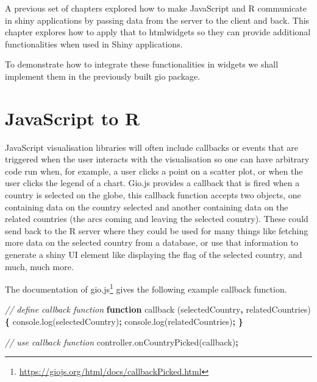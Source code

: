 \documentclass[
]{krantz}
\makeatletter
\newenvironment{Shaded}{\begin{snugshade}}{\end{snugshade}}
\newcommand{\AttributeTok}[1]{\textcolor[rgb]{0.61,0.61,0.61}{#1}}
\newcommand{\CommentTok}[1]{\textcolor[rgb]{0.37,0.37,0.37}{\textit{#1}}}
\newcommand{\KeywordTok}[1]{\textcolor[rgb]{0.27,0.27,0.27}{\textbf{#1}}}
\newcommand{\NormalTok}[1]{#1}
\newcommand{\OperatorTok}[1]{\textcolor[rgb]{0.43,0.43,0.43}{\textbf{#1}}}
\newcommand{\VariableTok}[1]{\textcolor[rgb]{0,0,0}{#1}}
\renewcommand{\href}[2]{#2\footnote{\url{#1}}}
\newenvironment{kframe}{%
\medskip{}
\setlength{\fboxsep}{.8em}
 \def\at@end@of@kframe{}%
 \ifinner\ifhmode%
  \def\at@end@of@kframe{\end{minipage}}%
  \begin{minipage}{\columnwidth}%
 \fi\fi%
 \def\FrameCommand##1{\hskip\@totalleftmargin \hskip-\fboxsep
 \colorbox{shadecolor}{##1}\hskip-\fboxsep
     \hskip-\linewidth \hskip-\@totalleftmargin \hskip\columnwidth}%
 \MakeFramed {\advance\hsize-\width
   \@totalleftmargin\z@ \linewidth\hsize
   \@setminipage}}%
 {\par\unskip\endMakeFramed%
 \at@end@of@kframe}
\renewenvironment{Shaded}{\begin{kframe}}{\end{kframe}}
\makeatother
\begin{document}
A previous set of chapters explored how to make JavaScript and R communicate in shiny applications by passing data from the server to the client and back. This chapter explores how to apply that to htmlwidgets so they can provide additional functionalities when used in Shiny applications.

To demonstrate how to integrate these functionalities in widgets we shall implement them in the previously built gio package.

\hypertarget{javascript-to-r}{%
\section{JavaScript to R}\label{javascript-to-r}}

JavaScript visualisation libraries will often include callbacks or events that are triggered when the user interacts with the visualisation so one can have arbitrary code run when, for example, a user clicks a point on a scatter plot, or when the user clicks the legend of a chart. Gio.js provides a callback that is fired when a country is selected on the globe, this callback function accepts two objects, one containing data on the country selected and another containing data on the related countries (the arcs coming and leaving the selected country). These could send back to the R server where they could be used for many things like fetching more data on the selected country from a database, or use that information to generate a shiny UI element like displaying the flag of the selected country, and much, much more.

The \href{https://giojs.org/html/docs/callbackPicked.html}{documentation of gio.js} gives the following example callback function.

\begin{Shaded}
\begin{Highlighting}[]
\CommentTok{// define callback function}
\KeywordTok{function} \AttributeTok{callback}\NormalTok{ (selectedCountry}\OperatorTok{,}\NormalTok{ relatedCountries) }\OperatorTok{\{}
  \VariableTok{console}\NormalTok{.}\AttributeTok{log}\NormalTok{(selectedCountry)}\OperatorTok{;}
  \VariableTok{console}\NormalTok{.}\AttributeTok{log}\NormalTok{(relatedCountries)}\OperatorTok{;}
\OperatorTok{\}}

\CommentTok{// use callback function}
\VariableTok{controller}\NormalTok{.}\AttributeTok{onCountryPicked}\NormalTok{(callback)}\OperatorTok{;}
\end{Highlighting}
\end{Shaded}
\end{document}
